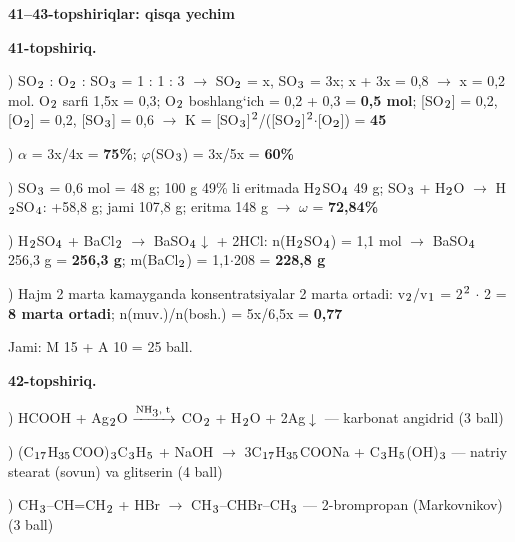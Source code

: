 \documentclass[11pt,a4paper]{article}
\renewcommand{\textsubscript}[1]{\ensuremath{_{\text{\fontsize{8}{8}\selectfont #1}}}}
\renewcommand{\textsuperscript}[1]{\ensuremath{^{\text{\fontsize{8}{8}\selectfont #1}}}}
\begin{document}
\noindent\textbf{41--43-topshiriqlar: qisqa yechim}\par\smallskip
\noindent\textbf{41-topshiriq.}\par
{}) SO\textsubscript{2} : O\textsubscript{2} : SO\textsubscript{3} = 1 : 1 : 3 $\to$ SO\textsubscript{2} = x, SO\textsubscript{3} = 3x; x + 3x = 0,8 $\to$ x = 0,2 mol. O\textsubscript{2} sarfi 1,5x = 0,3; O\textsubscript{2} boshlang`ich = 0,2 + 0,3 = \textbf{0,5 mol}; [SO\textsubscript{2}] = 0,2, [O\textsubscript{2}] = 0,2, [SO\textsubscript{3}] = 0,6 $\to$ K = [SO\textsubscript{3}]\textsuperscript{2}/([SO\textsubscript{2}]\textsuperscript{2}$\cdot$[O\textsubscript{2}]) = \textbf{45}\par
{}) $\alpha$ = 3x/4x = \textbf{75\%}; $\varphi$(SO\textsubscript{3}) = 3x/5x = \textbf{60\%}\par
{}) SO\textsubscript{3} = 0,6 mol = 48 g; 100 g 49\% li eritmada H\textsubscript{2}SO\textsubscript{4} 49 g; SO\textsubscript{3} + H\textsubscript{2}O $\to$ H\textsubscript{2}SO\textsubscript{4}: +58,8 g; jami 107,8 g; eritma 148 g $\to$ $\omega$ = \textbf{72,84\%}\par
{}) H\textsubscript{2}SO\textsubscript{4} + BaCl\textsubscript{2} $\to$ BaSO\textsubscript{4}$\downarrow$ + 2HCl: n(H\textsubscript{2}SO\textsubscript{4}) = 1,1 mol $\to$ BaSO\textsubscript{4} 256,3 g = \textbf{256,3 g}; m(BaCl\textsubscript{2}) = 1,1$\cdot$208 = \textbf{228,8 g}\par
{}) Hajm 2 marta kamayganda konsentratsiyalar 2 marta ortadi: v\textsubscript{2}/v\textsubscript{1} = 2\textsuperscript{2} $\cdot$ 2 = \textbf{8 marta ortadi}; n(muv.)/n(bosh.) = 5x/6,5x = \textbf{0,77}\par
\noindent Jami: M 15 + A 10 = 25 ball.\par
\noindent\textbf{42-topshiriq.}\par
{}) HCOOH + Ag\textsubscript{2}O $\xrightarrow{\text{NH\textsubscript{3}, t}}$ CO\textsubscript{2} + H\textsubscript{2}O + 2Ag$\downarrow$ --- karbonat angidrid (3 ball)\par
{}) (C\textsubscript{17}H\textsubscript{35}COO)\textsubscript{3}C\textsubscript{3}H\textsubscript{5} + NaOH $\to$ 3C\textsubscript{17}H\textsubscript{35}COONa + C\textsubscript{3}H\textsubscript{5}(OH)\textsubscript{3} --- natriy stearat (sovun) va glitserin (4 ball)\par
{}) CH\textsubscript{3}--CH=CH\textsubscript{2} + HBr $\to$ CH\textsubscript{3}--CHBr--CH\textsubscript{3} --- 2-brompropan (Markovnikov) (3 ball)\par
\end{document}
